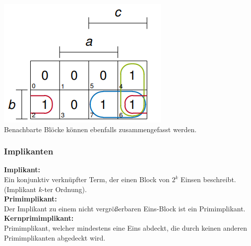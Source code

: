 \documentclass[12pt]{article}
\begin{document}
\includegraphics[scale=0.6]{image4.png} \\
Benachbarte Blöcke können ebenfalls zusammengefasst werden.
\newpage
\subsubsection{Implikanten}
\textbf{Implikant:} \\
Ein konjunktiv verknüpfter Term, der einen Block von $2^k$ Einsen beschreibt. (Implikant $k$-ter Ordnung). \\
\newline
\textbf{Primimplikant:} \\
Der Implikant zu einem nicht vergrößerbaren Eins-Block ist ein Primimplikant. \\
\newline
\textbf{Kernprimimplikant:} \\
Primimplikant, welcher mindestens eine Eins abdeckt, die durch keinen anderen Primimplikanten abgedeckt wird. 
\end{document}
